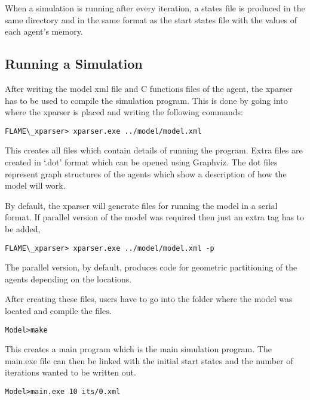 When a simulation is running after every iteration, a states file is produced
in the same directory and in the same format as the start states file with the
values of each agent's memory.

\subsection{Running a Simulation}

After writing the model xml file and C functions files of the agent, the xparser has to be used to compile the simulation program. This is done by going into where the xparser is placed and writing the following commands:

\begin{mylisting}
\begin{verbatim}
FLAME\_xparser> xparser.exe ../model/model.xml
\end{verbatim}
\end{mylisting}

This creates all files which contain details of running the program. Extra files are created in `.dot' format which can be opened using Graphviz. The dot files represent graph structures of the agents which show a description of how the model will work.

By default, the xparser will generate files for running the model in a serial format. If parallel version of the model was required then just an extra tag has to be added,

\begin{mylisting}
\begin{verbatim}
FLAME\_xparser> xparser.exe ../model/model.xml -p
\end{verbatim}
\end{mylisting}

The parallel version, by default, produces code for geometric partitioning of the agents depending on the locations. 

After creating these files, users have to go into the folder where the model was located and compile the files.

\begin{mylisting}
\begin{verbatim}
Model>make 
\end{verbatim}
\end{mylisting}

This creates a main program which is the main simulation program. The main.exe file can then be linked with the initial start states and the number of iterations wanted to be written out.
\begin{mylisting}
\begin{verbatim}
Model>main.exe 10 its/0.xml
\end{verbatim}
\end{mylisting}

